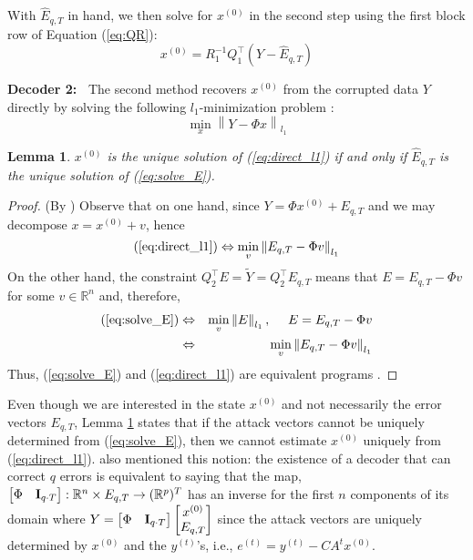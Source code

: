 \documentclass[journal]{IEEEtran}
\newcommand{\norm}[1]{\left\lVert#1\right\rVert}
\newtheorem{lem}{\bf{Lemma}}
\begin{document}
With $\hat E_{q,T}$ in hand, we then solve for $x^{(0)}$ in the second step using the first block row of Equation (\ref{eq:QR}):
\begin{equation}
	x^{(0)} = R_1^{-1} Q_1^\top (Y- \hat E_{q,T})
	\label{eq:QR1}
\end{equation}

\noindent
{\bf Decoder 2:~} 
The second method recovers $x^{(0)}$ from the corrupted data $Y$ directly by solving the following $l_1$-minimization problem \cite{Candes_Tao}:
\begin{equation}
	\min_x \norm { Y  - \Phi x}_{l_1}
	\label{eq:direct_l1}
\end{equation}

\begin{lem} \label{lem:equivalent}
 $x^{(0)}$ is the unique solution of (\ref{eq:direct_l1}) if and only if ${\hat E}_{q,T}$ is the unique solution of (\ref{eq:solve_E}).
\end{lem}
\begin{proof} (By \cite{Candes_Tao}) Observe that on one hand, since $Y = \Phi x^{(0)} + E_{q,T}$ and we may decompose $x = x^{(0)} + v$, hence 
\begin{equation}
	(\ref{eq:direct_l1}) \Leftrightarrow \min_v \norm{  E_{q,T} - \Phi v }_{l_1} \nonumber 
\end{equation}
On the other hand, the constraint $Q_2^\top E = \tilde Y = Q_2^\top E_{q,T}$ means that $E = E_{q,T} - \Phi v $ for some $v \in \mathbb{R}^n$ and, therefore,
\begin{eqnarray}
	(\ref{eq:solve_E}) &\Leftrightarrow& \min_v \norm{ E }_{l_1}, ~~~~ E = E_{q,T}-\Phi v  \nonumber \\
				 & \Leftrightarrow& \min_v  \norm{E_{q,T}-\Phi v}_{l_1} \nonumber 
\end{eqnarray}
Thus, (\ref{eq:solve_E}) and (\ref{eq:direct_l1}) are equivalent programs \cite{Candes_Tao}.
\end{proof}
\noindent Even though we are interested in the state $x^{(0)}$ and not necessarily the error vectors $E_{q,T}$, Lemma \ref{lem:equivalent} states that if the attack vectors cannot be uniquely determined from (\ref{eq:solve_E}), then we cannot estimate $x^{(0)}$ uniquely from (\ref{eq:direct_l1}). \cite{Fawzi2014} also mentioned this notion: the existence of a decoder that can correct $q$ errors is equivalent to saying that the map, $\begin{bmatrix} \Phi & {\bf I}_{q\cdot T} \end{bmatrix}: \mathbb{R}^n \times E_{q,T} \rightarrow (\mathbb{R}^p)^T$ has an inverse for the first $n$ components of its domain where $Y = \begin{bmatrix} \Phi & {\bf I}_{q\cdot T} \end{bmatrix} \begin{bmatrix} x^{(0)} \\ E_{q,T} \end{bmatrix} $ since the attack vectors are uniquely determined by $x^{(0)}$ and the $y^{(t)}$'s, i.e., $e^{(t)} = y^{(t)} - CA ^t x^{(0)}$. 
\end{document}
